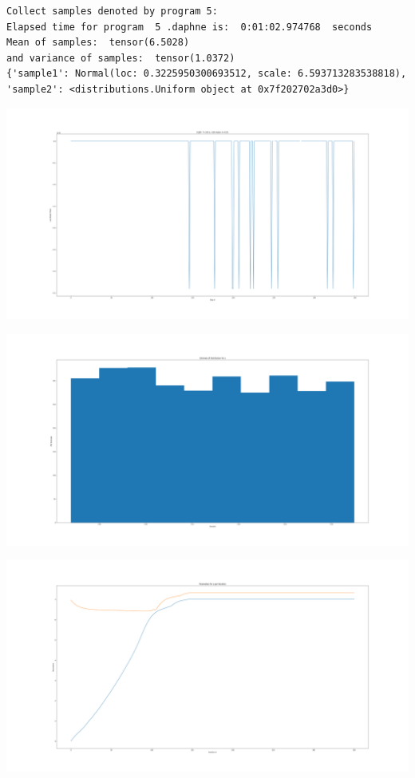 \documentclass[]{article}
\begin{document}
\begin{verbatim}
Collect samples denoted by program 5:
Elapsed time for program  5 .daphne is:  0:01:02.974768  seconds
Mean of samples:  tensor(6.5028)
and variance of samples:  tensor(1.0372)
{'sample1': Normal(loc: 0.3225950300693512, scale: 6.593713283538818), 'sample2': <distributions.Uniform object at 0x7f202702a3d0>}
\end{verbatim}
\begin{center}
	\includegraphics[width=\linewidth]{Figures/elbo_5Adam.png}
\end{center}
\begin{center}
	\includegraphics[width=\linewidth]{Figures/pdfEstP5.png}
\end{center}
\begin{center}
	\includegraphics[width=\linewidth]{Figures/estParamsP5.png}
\end{center}
\end{document}
